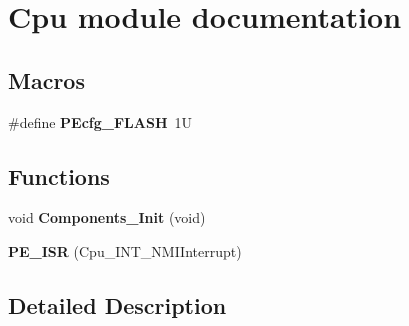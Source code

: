 \hypertarget{group___cpu__module}{}\section{Cpu module documentation}
\label{group___cpu__module}
\subsection*{Macros}
\begin{DoxyCompactItemize}
\item 
\#define {\bfseries P\+Ecfg\+\_\+\+F\+L\+A\+SH}~1U\hypertarget{group___cpu__module_gae2f84b335ab99b9e98d41e8a530b1540}{}\label{group___cpu__module_gae2f84b335ab99b9e98d41e8a530b1540}

\end{DoxyCompactItemize}
\subsection*{Functions}
\begin{DoxyCompactItemize}
\item 
void {\bfseries Components\+\_\+\+Init} (void)\hypertarget{group___cpu__module_ga2050a66f3a2a54d567b252bc675f82cd}{}\label{group___cpu__module_ga2050a66f3a2a54d567b252bc675f82cd}

\item 
{\bfseries P\+E\+\_\+\+I\+SR} (Cpu\+\_\+\+I\+N\+T\+\_\+\+N\+M\+I\+Interrupt)\hypertarget{group___cpu__module_ga89f6e345028fe4a0a105f4f95e1bb85c}{}\label{group___cpu__module_ga89f6e345028fe4a0a105f4f95e1bb85c}

\end{DoxyCompactItemize}


\subsection{Detailed Description}
